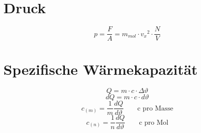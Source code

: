 \section{Druck}
\[ \boxed{p = \frac{F}{A} = m_{mol} \cdot {v_x}^2 \cdot \frac{N}{V}} \]

\section{Spezifische Wärmekapazität}
\[ Q = m \cdot c \cdot \Delta \vartheta \]
\[ dQ = m \cdot c \cdot d \vartheta \]
\[ c_{(m)} = \frac{1}{m} \frac{dQ}{d \vartheta} \qquad \text{c pro Masse}\]
\[ c_{(n)} = \frac{1}{n} \frac{dQ}{d \vartheta} \qquad \text{c pro Mol}\]